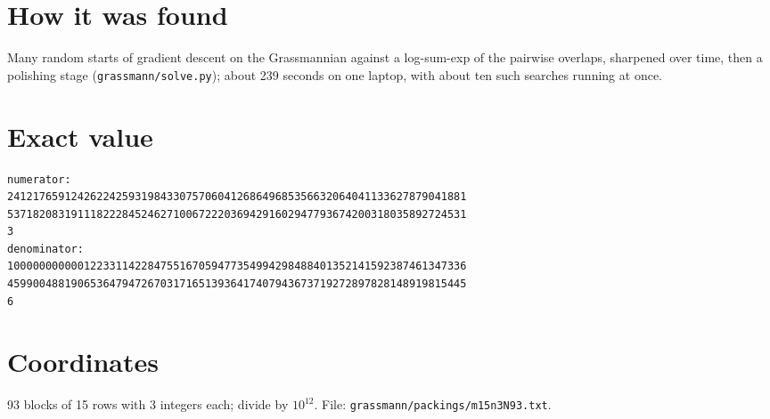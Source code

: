 \documentclass[11pt,a4paper]{article}
\begin{document}
\section{How it was found}
Many random starts of gradient descent on the Grassmannian against a log-sum-exp of the pairwise overlaps, sharpened over time, then a polishing stage (\texttt{grassmann/solve.py}); about 239 seconds on one laptop, with about ten such searches running at once.


\appendix
\section{Exact value}
{\small
\begin{verbatim}
numerator:
241217659124262242593198433075706041268649685356632064041133627879041881
537182083191118222845246271006722203694291602947793674200318035892724531
3
denominator:
100000000000122331142284755167059477354994298488401352141592387461347336
459900488190653647947267031716513936417407943673719272897828148919815445
6
\end{verbatim}}

\section{Coordinates}
93 blocks of 15 rows with 3 integers each; divide by $10^{12}$. File: \texttt{grassmann/packings/m15n3N93.txt}.
{\tiny
\begin{multicols}{3}
\end{multicols}}
\end{document}
